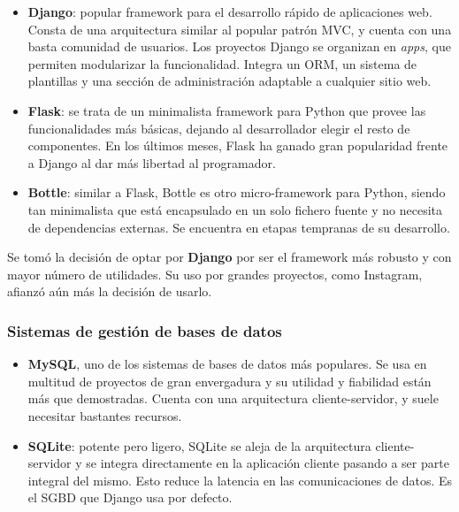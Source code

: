 \begin{itemize}
\item \textbf{Django}: popular framework para el desarrollo rápido de
  aplicaciones web. Consta de una arquitectura similar al popular patrón
  \ac{MVC}, y cuenta con una basta comunidad de usuarios. Los proyectos Django
  se organizan en \textit{apps}, que permiten modularizar la
  funcionalidad. Integra un \ac{ORM}, un sistema de plantillas y una sección de
  administración adaptable a cualquier sitio web.

\item \textbf{Flask}: se trata de un minimalista framework para Python que
  provee las funcionalidades más básicas, dejando al desarrollador elegir el
  resto de componentes. En los últimos meses, Flask ha ganado gran popularidad
  frente a Django al dar más libertad al programador.

\item \textbf{Bottle}: similar a Flask, Bottle es otro micro-framework para
  Python, siendo tan minimalista que está encapsulado en un solo fichero fuente
  y no necesita de dependencias externas. Se encuentra en etapas tempranas de su desarrollo.

\end{itemize}

Se tomó la decisión de optar por \textbf{Django} por ser el framework más
robusto y con mayor número de utilidades. Su uso por grandes proyectos, como
Instagram, afianzó aún más la decisión de usarlo.

\subsubsection{Sistemas de gestión de bases de datos}

\begin{itemize}
\item \textbf{MySQL}, uno de los sistemas de bases de datos más populares. Se
  usa en multitud de proyectos de gran envergadura y su utilidad y fiabilidad
  están más que demostradas. Cuenta con una arquitectura cliente-servidor, y
  suele necesitar bastantes recursos.

\item \textbf{SQLite}: potente pero ligero, SQLite se aleja de la arquitectura
  cliente-servidor y se integra directamente en la aplicación cliente pasando a
  ser parte integral del mismo. Esto reduce la latencia en las comunicaciones de
  datos. Es el SGBD que Django usa por defecto.

\end{itemize}

